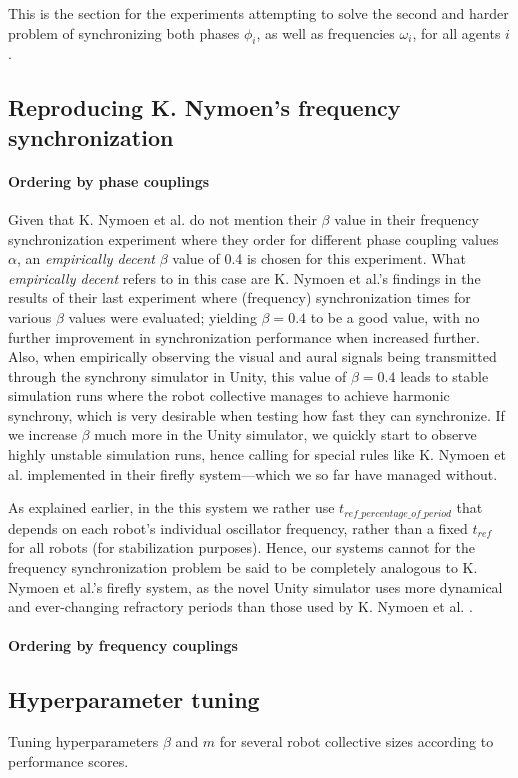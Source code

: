 	This is the section for the experiments attempting to solve the second and harder problem of synchronizing both phases $\phi_i$, as well as frequencies $\omega_i$, for all agents $i$.

	\subsection{Reproducing K. Nymoen's frequency synchronization}
	
	\paragraph{Ordering by phase couplings}
	Given that K. Nymoen et al. \cite{nymoen_synch} do not mention their $\beta$ value in their frequency synchronization experiment where they order for different phase coupling values $\alpha$, an \textit{empirically decent} $\beta$ value of 0.4 is chosen for this experiment. What \textit{empirically decent} refers to in this case are K. Nymoen et al.'s findings in the results of their last experiment where (frequency) synchronization times for various $\beta$ values were evaluated; yielding $\beta=0.4$ to be a good value, with no further improvement in synchronization performance when increased further. Also, when empirically observing the visual and aural signals being transmitted through the synchrony simulator in Unity, this value of $\beta=0.4$ leads to stable simulation runs where the robot collective manages to achieve harmonic synchrony, which is very desirable when testing how fast they can synchronize. If we increase $\beta$ much more in the Unity simulator, we quickly start to observe highly unstable simulation runs, hence calling for special rules like K. Nymoen et al. implemented in their firefly system—which we so far have managed without.
	
	
	As explained earlier, in the this system we rather use $t_{ref\_percentage\_of\_period}$ that depends on each robot's individual oscillator frequency, rather than a fixed $t_{ref}$ for all robots (for stabilization purposes). Hence, our systems cannot for the frequency synchronization problem be said to be completely analogous to K. Nymoen et al.'s firefly system, as the novel Unity simulator uses more dynamical and ever-changing refractory periods than those used by K. Nymoen et al. \cite{nymoen_synch}.
	
	\paragraph{Ordering by frequency couplings}
	
	\subsection{Hyperparameter tuning}
	Tuning hyperparameters $\beta$ and $m$ for several robot collective sizes according to performance scores.